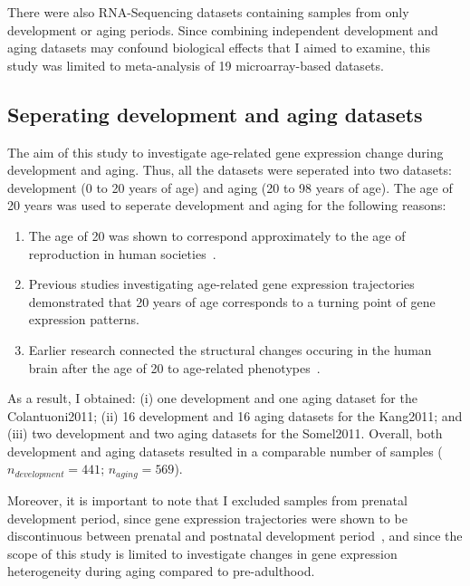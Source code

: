There were also RNA-Sequencing datasets containing samples from only development or aging periods. 
Since combining independent development and aging datasets may confound biological effects that I aimed to examine, 
this study was limited to meta-analysis of 19 microarray-based datasets. 

\subsection{Seperating development and aging datasets}
The aim of this study to investigate age-related gene expression change during development and aging. 
Thus, all the datasets were seperated into two datasets: development (0 to 20 years of age) and aging (20 to 98 years of age).
The age of 20 years was used to seperate development and aging for the following reasons:
\begin{enumerate}
    \item The age of 20 was shown to correspond approximately to the age of reproduction in human societies~\cite{Walker2006}.
    \item Previous studies investigating age-related gene expression trajectories demonstrated that 20 years of age corresponds to a turning point of gene expression patterns\cite{Colantuoni2011, Donertas2017,Somel2010}.
    \item Earlier research connected the structural changes occuring in the human brain after the age of 20 to age-related phenotypes~\cite{Sowell2004}.
\end{enumerate}

As a result, I obtained: 
(i) one development and one aging dataset for the Colantuoni2011; 
(ii) 16 development and 16 aging datasets for the Kang2011; and
(iii) two development and two aging datasets for the Somel2011.
Overall, both development and aging datasets resulted in a comparable number of samples ($n_{development} = 441$; $n_{aging}=569$).

Moreover, it is important to note that I excluded samples from prenatal development period, 
since gene expression trajectories were shown to be discontinuous between prenatal and postnatal development period~\cite{Colantuoni2011,Kang2011}, 
and since the scope of this study is limited to investigate changes in gene expression heterogeneity during aging compared to pre-adulthood.

